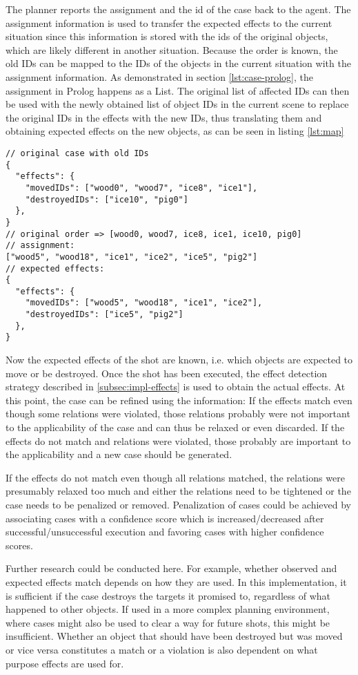 The planner reports the assignment and the id of the case back to the agent. The assignment information is used to transfer the expected effects to the current situation since this information is stored with the ids of the original objects, which are likely different in another situation.
Because the order is known, the old IDs can be mapped to the IDs of the objects in the current situation with the assignment information. As demonstrated in section \ref{lst:case-prolog}, the assignment in Prolog happens as a List.
The original list of affected IDs can then be used with the newly obtained list of object IDs in the current scene to replace the original IDs in the effects with the new IDs, thus translating them and obtaining expected effects on the new objects, as can be seen in listing \ref{lst:map}

\begin{lstlisting}[label=lst:map, caption=Exemplary mapping of old to new IDs]
// original case with old IDs
{
  "effects": {
    "movedIDs": ["wood0", "wood7", "ice8", "ice1"],
    "destroyedIDs": ["ice10", "pig0"]
  },
}
// original order => [wood0, wood7, ice8, ice1, ice10, pig0]
// assignment:
["wood5", "wood18", "ice1", "ice2", "ice5", "pig2"]
// expected effects:
{
  "effects": {
    "movedIDs": ["wood5", "wood18", "ice1", "ice2"],
    "destroyedIDs": ["ice5", "pig2"]
  },
}
\end{lstlisting}


Now the expected effects of the shot are known, i.e. which objects are expected to move or be destroyed.
Once the shot has been executed, the effect detection strategy described in \ref{subsec:impl-effects} is used to obtain the actual effects.
At this point, the case can be refined using the information: If the effects match even though some relations were violated, those relations probably were not important to the applicability of the case and can thus be relaxed or even discarded.
If the effects do not match and relations were violated, those probably are important to the applicability and a new case should be generated.

If the effects do not match even though all relations matched, the relations were presumably relaxed too much and either the relations need to be tightened or the case needs to be penalized or removed. Penalization of cases could be achieved by associating cases with a confidence score which is increased/decreased after successful/unsuccessful execution and favoring cases with higher confidence scores.


Further research could be conducted here. For example, whether observed and expected effects match depends on how they are used. In this implementation, it is sufficient if the case destroys the targets it promised to, regardless of what happened to other objects.
If used in a more complex planning environment, where cases might also be used to clear a way for future shots, this might be insufficient. Whether an object that should have been destroyed but was moved or vice versa constitutes a match or a violation is also dependent on what purpose effects are used for.